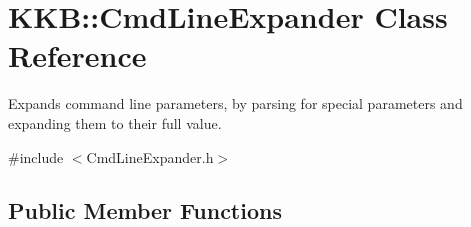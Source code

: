 \hypertarget{class_k_k_b_1_1_cmd_line_expander}{}\section{K\+KB\+:\+:Cmd\+Line\+Expander Class Reference}
\label{class_k_k_b_1_1_cmd_line_expander}


Expands command line parameters, by parsing for special parameters and expanding them to their full value.  




{\ttfamily \#include $<$Cmd\+Line\+Expander.\+h$>$}

\subsection*{Public Member Functions}
